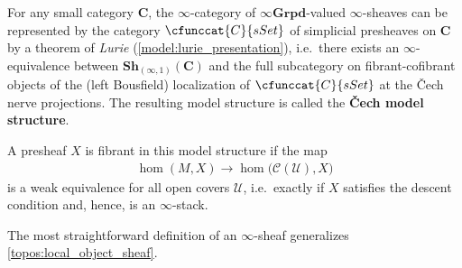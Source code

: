         \begin{property}\label{topos:cech_model_structure}
            For any small category $\mathbf{C}$, the $\infty$-category of $\infty\mathbf{Grpd}$-valued $\infty$-sheaves can be represented by the category $\cfunccat{C}{sSet}$ of simplicial presheaves on $\mathbf{C}$ by a theorem of \textit{Lurie} (\cref{model:lurie_presentation}), i.e.~there exists an $\infty$-equivalence between $\mathbf{Sh}_{(\infty,1)}(\mathbf{C})$ and the full subcategory on fibrant-cofibrant objects of the (left Bousfield) localization of $\cfunccat{C}{sSet}$ at the \v{C}ech nerve projections. The resulting model structure is called the \textbf{\v{C}ech model structure}.
    
            A presheaf $X$ is fibrant in this model structure if the map
            \begin{gather}
                \hom(M,X)\rightarrow\hom\bigl(\mathcal{C}(\mathcal{U}),X\bigr)
            \end{gather}
            is a weak equivalence for all open covers $\mathcal{U}$, i.e.~exactly if $X$ satisfies the descent condition and, hence, is an $\infty$-stack.
        \end{property}
    
        The most straightforward definition of an $\infty$-sheaf generalizes \cref{topos:local_object_sheaf}.
    
